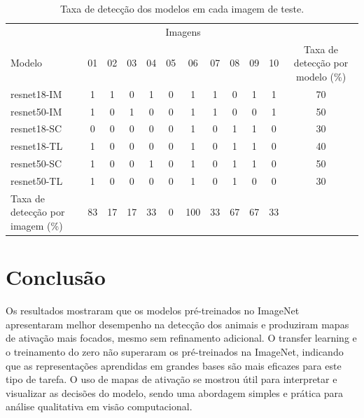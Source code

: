 \documentclass[%
 reprint,
 amsmath,amssymb,
 aps,
]{revtex4-2}
\begin{document}
\begin{table}[b]
\caption{\label{tab:detecao}
Taxa de detecção dos modelos em cada imagem de teste.}
\begin{ruledtabular}
\begin{tabular}{lccccccccccc}
\hline
 & \multicolumn{10}{c}{Imagens} & \\
Modelo & 01 & 02 & 03 & 04 & 05 & 06 & 07 & 08 & 09 & 10 & Taxa de detecção por modelo (\%) \\
\hline
resnet18-IM   & 1 & 1 & 0 & 1 & 0 & 1 & 1 & 0 & 1 & 1 & 70 \\
resnet50-IM   & 1 & 0 & 1 & 0 & 0 & 1 & 1 & 0 & 0 & 1 & 50 \\
resnet18-SC   & 0 & 0 & 0 & 0 & 0 & 1 & 0 & 1 & 1 & 0 & 30 \\
resnet18-TL   & 1 & 0 & 0 & 0 & 0 & 1 & 0 & 1 & 1 & 0 & 40 \\
resnet50-SC   & 1 & 0 & 0 & 1 & 0 & 1 & 0 & 1 & 1 & 0 & 50 \\
resnet50-TL   & 1 & 0 & 0 & 0 & 0 & 1 & 0 & 1 & 0 & 0 & 30 \\
\hline
Taxa de detecção por imagem (\%) & 83 & 17 & 17 & 33 & 0 & 100 & 33 & 67 & 67 & 33 & \\
\end{tabular}
\end{ruledtabular}
\end{table}

\section{Conclusão}

Os resultados mostraram que os modelos pré-treinados no ImageNet apresentaram melhor desempenho na detecção dos animais e produziram mapas de ativação mais focados, mesmo sem refinamento adicional. O transfer learning e o treinamento do zero não superaram os pré-treinados na ImageNet, indicando que as representações aprendidas em grandes bases são mais eficazes para este tipo de tarefa. O uso de mapas de ativação se mostrou útil para interpretar e visualizar as decisões do modelo, sendo uma abordagem simples e prática para análise qualitativa em visão computacional.


\end{document}
